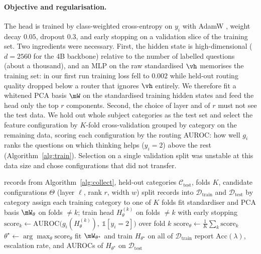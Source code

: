 \documentclass{article}
\newcommand{\gain}{g}
\begin{document}
\paragraph{Objective and regularisation.}
The head is trained by class-weighted cross-entropy on $y_i$ with AdamW \citep{loshchilov2019adamw}, weight decay $0.05$, dropout $0.3$, and early stopping on a validation slice of the training set. Two ingredients were necessary. First, the hidden state is high-dimensional ($d=2560$ for the 4B backbone) relative to the number of labelled questions (about a thousand), and an MLP on the raw standardised $\vh$ memorises the training set: in our first run training loss fell to $0.002$ while held-out routing quality dropped below a router that ignores $\vh$ entirely. We therefore fit a whitened PCA basis $\mW$ on the standardised training hidden states and feed the head only the top $r$ components. Second, the choice of layer and of $r$ must not see the test data. We hold out whole subject categories as the test set and select the feature configuration by $K$-fold cross-validation grouped by category on the remaining data, scoring each configuration by the routing AUROC: how well $\gain_i$ ranks the questions on which thinking helps ($y_i=2$) above the rest (Algorithm~\ref{alg:train}). Selection on a single validation split was unstable at this data size and chose configurations that did not transfer.

\begin{algorithm}[t]
\caption{Decision head training with grouped selection}
\label{alg:train}
\begin{algorithmic}[1]
\REQUIRE records from Algorithm~\ref{alg:collect}, held-out categories $\mathcal{C}_{\text{test}}$, folds $K$, candidate configurations $\Theta$ (layer $\ell$, rank $r$, width $w$)
\STATE split records into $\mathcal{D}_{\text{train}}$ and $\mathcal{D}_{\text{test}}$ by category
\STATE assign each training category to one of $K$ folds
    \STATE fit standardiser and PCA basis $\mW_\theta$ on folds $\ne k$; train head $H_\theta^{(k)}$ on folds $\ne k$ with early stopping
    \STATE $\mathrm{score}_k\leftarrow\mathrm{AUROC}\big(\gain_i(H_\theta^{(k)}),\ \mathbb{1}[y_i=2]\big)$ over fold $k$
  \ENDFOR
  \STATE $\mathrm{score}_\theta\leftarrow\frac{1}{K}\sum_k\mathrm{score}_k$
\ENDFOR
\STATE $\theta^\star\leftarrow\arg\max_\theta\mathrm{score}_\theta$
\STATE fit $\mW_{\theta^\star}$ and train $H_{\theta^\star}$ on all of $\mathcal{D}_{\text{train}}$
\STATE report $\mathrm{Acc}(\lambda)$, escalation rate, and AUROCs of $H_{\theta^\star}$ on $\mathcal{D}_{\text{test}}$
\end{algorithmic}
\end{algorithm}
\end{document}
